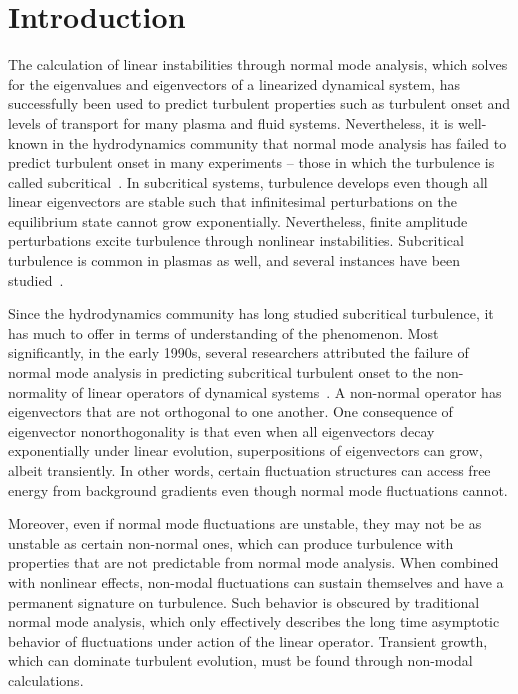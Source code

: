 \documentclass[twocolumn,showkeys,superscriptaddress]{revtex4}
\begin{document}
\section{Introduction}

The calculation of linear instabilities through normal mode analysis, which solves for the eigenvalues and eigenvectors of a linearized dynamical system,
has successfully been used to predict turbulent properties such as turbulent onset and levels of transport for many plasma and fluid systems.
Nevertheless, it is well-known in the hydrodynamics community that normal mode analysis has failed to predict turbulent onset in many experiments -- those in which the
turbulence is called subcritical~\cite{drazin1981}. 
In subcritical systems, turbulence develops even though all linear eigenvectors are stable such that infinitesimal perturbations on the equilibrium state cannot grow exponentially. 
Nevertheless, finite amplitude perturbations excite turbulence through nonlinear instabilities.
Subcritical turbulence is common in plasmas as well, and several instances have been studied~\cite{waltz1985,scott1990,nordman1993,biskamp1995,drake1995,itoh1996,camargo1998,krommes1999,camporeale2009,schekochihin2012,highcock2012}. 

Since the hydrodynamics community has long studied subcritical turbulence, it has much to offer in terms of understanding of the phenomenon. Most significantly,
in the early 1990s, several researchers attributed the failure of normal mode analysis in predicting subcritical turbulent onset to the non-normality of linear operators of
dynamical systems~\cite{gustavsson1991,butler1992,trefethen1993,reddy1993,henningson1994,schmid2007}. A non-normal operator has 
eigenvectors that are not orthogonal to one another. One consequence of eigenvector nonorthogonality is that even when all eigenvectors decay exponentially under linear evolution, 
superpositions of eigenvectors can grow, albeit transiently.
In other words, certain fluctuation structures can access free energy from background gradients even though normal mode fluctuations cannot.

Moreover, even if normal mode fluctuations are unstable, they may not be as unstable as certain non-normal ones, which can produce turbulence with properties that are not predictable
from normal mode analysis.
When combined with nonlinear effects, non-modal fluctuations can sustain themselves and have a permanent signature on turbulence.
Such behavior is obscured by traditional normal mode analysis, which only effectively describes the long time asymptotic behavior of fluctuations under  
action of the linear operator. Transient growth, which can dominate turbulent evolution, must be found through non-modal calculations.
\end{document}
